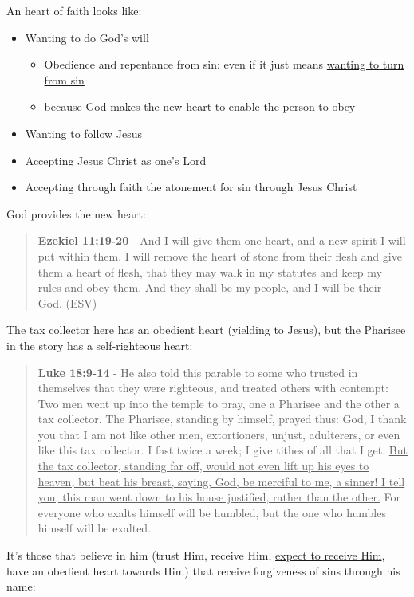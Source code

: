 \documentclass[11pt]{article}
\begin{document}
An heart of faith looks like:
\begin{itemize}
\item Wanting to do God's will
\begin{itemize}
\item Obedience and repentance from sin: even if it just means \uline{wanting to turn from sin}
\item because God makes the new heart to enable the person to obey
\end{itemize}
\item Wanting to follow Jesus
\item Accepting Jesus Christ as one's Lord
\item Accepting through faith the atonement for sin through Jesus Christ
\end{itemize}

God provides the new heart:

\begin{quote}
\textbf{Ezekiel 11:19-20} - And I will give them one heart, and a new spirit I will put within them. I will remove the heart of stone from their flesh and give them a heart of flesh, that they may walk in my statutes and keep my rules and obey them. And they shall be my people, and I will be their God. (ESV)
\end{quote}

The tax collector here has an obedient heart (yielding to Jesus), but the Pharisee in the story has a self-righteous heart:

\begin{quote}
\textbf{Luke 18:9-14} - He also told this parable to some who trusted in themselves that they were righteous, and treated others with contempt: Two men went up into the temple to pray, one a Pharisee and the other a tax collector. The Pharisee, standing by himself, prayed thus: God, I thank you that I am not like other men, extortioners, unjust, adulterers, or even like this tax collector. I fast twice a week; I give tithes of all that I get. \uline{But the tax collector, standing far off, would not even lift up his eyes to heaven, but beat his breast, saying, God, be merciful to me, a sinner! I tell you, this man went down to his house justified, rather than the other.} For everyone who exalts himself will be humbled, but the one who humbles himself will be exalted.
\end{quote}

It's those that believe in him (trust Him, receive Him, \uline{expect to receive Him}, have an obedient heart towards Him) that receive forgiveness of sins through his name:
\end{document}

